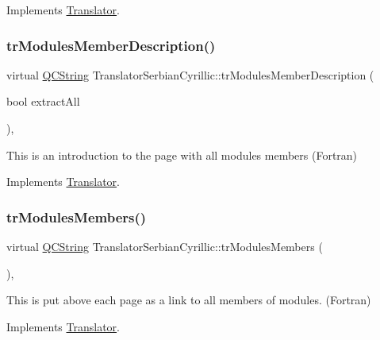 Implements \mbox{\hyperlink{class_translator}{Translator}}.

\mbox{\label{class_translator_serbian_cyrillic_a279c81aec7983e15a7917c000887a4ae}} 
\subsubsection{\texorpdfstring{trModulesMemberDescription()}{trModulesMemberDescription()}}
{\footnotesize\ttfamily virtual \mbox{\hyperlink{class_q_c_string}{Q\+C\+String}} Translator\+Serbian\+Cyrillic\+::tr\+Modules\+Member\+Description (\begin{DoxyParamCaption}\item[{bool}]{extract\+All }\end{DoxyParamCaption})\hspace{0.3cm}{\ttfamily [inline]}, {\ttfamily [virtual]}}

This is an introduction to the page with all modules members (Fortran) 

Implements \mbox{\hyperlink{class_translator}{Translator}}.

\mbox{\label{class_translator_serbian_cyrillic_a4fc476f9d39e2a14d5dad2b1345ae1b1}} 
\subsubsection{\texorpdfstring{trModulesMembers()}{trModulesMembers()}}
{\footnotesize\ttfamily virtual \mbox{\hyperlink{class_q_c_string}{Q\+C\+String}} Translator\+Serbian\+Cyrillic\+::tr\+Modules\+Members (\begin{DoxyParamCaption}{ }\end{DoxyParamCaption})\hspace{0.3cm}{\ttfamily [inline]}, {\ttfamily [virtual]}}

This is put above each page as a link to all members of modules. (Fortran) 

Implements \mbox{\hyperlink{class_translator}{Translator}}.


